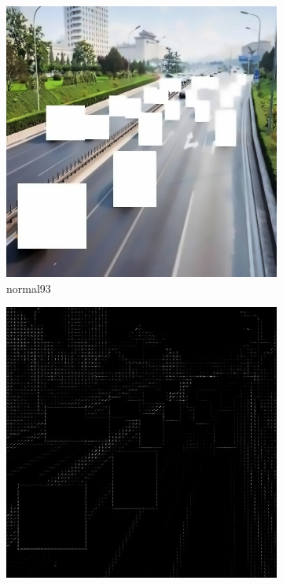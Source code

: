 \documentclass[a4paper, 10pt]{article}
\begin{document}
	\begin{figure}[htbp] 
		\centering 
		
		\begin{subfigure}{0.24\textwidth}
			\includegraphics[width=\linewidth]{picture/alldata_filled/normal93}
			\caption{normal93}
			\label{fig: normal93}	
		\end{subfigure}
		\begin{subfigure}{0.24\textwidth}
			\includegraphics[width=\linewidth]{picture/alldata_filled_hog/normal93}

\end{subfigure}
\end{figure}
\end{document}
